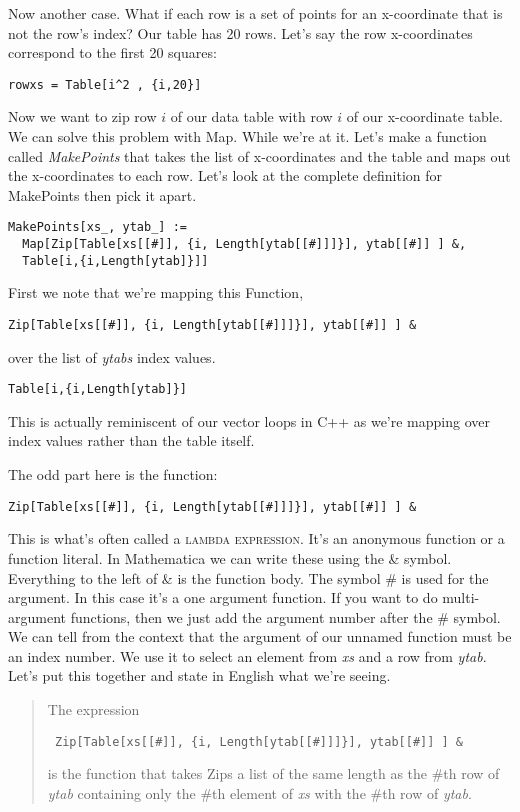 \documentclass[]{tufte-handout}
\begin{document}
Now another case. What if each row is a set of points for an x-coordinate that is not the row's index? Our table has 20 rows. Let's say the row x-coordinates correspond to the first 20 squares:
\begin{verbatim}
rowxs = Table[i^2 , {i,20}]
\end{verbatim}
Now we want to zip row $i$ of our data table with row $i$ of our x-coordinate table. We can solve this problem with Map.  While we're at it. Let's make a function called \textit{MakePoints} that takes the list of x-coordinates and the table and maps out the x-coordinates to each row. Let's look at the complete definition for MakePoints then pick it apart.
\begin{verbatim}
MakePoints[xs_, ytab_] :=
  Map[Zip[Table[xs[[#]], {i, Length[ytab[[#]]]}], ytab[[#]] ] &, 	
  Table[i,{i,Length[ytab]}]]	
\end{verbatim}

First we note that we're mapping this Function, 
\begin{verbatim}
Zip[Table[xs[[#]], {i, Length[ytab[[#]]]}], ytab[[#]] ] &
\end{verbatim}
over the list of \textit{ytabs} index values.
\begin{verbatim}
Table[i,{i,Length[ytab]}]
\end{verbatim}
This is actually reminiscent of our vector loops in C++ as we're mapping over index values rather than the table itself. 

The odd part here is the function:
\begin{verbatim}
Zip[Table[xs[[#]], {i, Length[ytab[[#]]]}], ytab[[#]] ] &
\end{verbatim}
This is what's often called a \textsc{lambda expression}. It's an anonymous function or a function literal. In Mathematica we can write these using the \& symbol. Everything to the left of \& is the function body. The symbol \# is used for the argument. In this case it's a one argument function. If you want to do multi-argument functions, then we just add the argument number after the \# symbol. We can tell from the context that the argument of our unnamed function must be an index number. We use it to select an element from \textit{xs} and a row from \textit{ytab}.  Let's put this together and state in English what we're seeing.
\begin{quote}
The expression \begin{verbatim} Zip[Table[xs[[#]], {i, Length[ytab[[#]]]}], ytab[[#]] ] & \end{verbatim} is the function that takes Zips a list of the same length as the \#th row of \textit{ytab} containing only the \#th element of \textit{xs} with the \#th row of \textit{ytab}. 
\end{quote}
\end{document}
